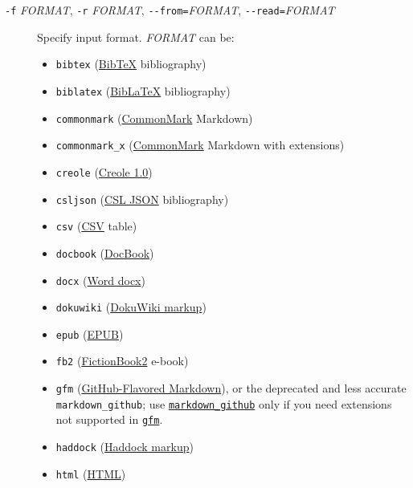 \documentclass[]{article}
\providecommand{\tightlist}{%
  \setlength{\itemsep}{0pt}\setlength{\parskip}{0pt}}
\begin{document}
\begin{description}
\item[\texttt{-f} \emph{FORMAT}, \texttt{-r} \emph{FORMAT},
\texttt{-\/-from=}\emph{FORMAT}, \texttt{-\/-read=}\emph{FORMAT}]
Specify input format. \emph{FORMAT} can be:

\hypertarget{input-formats}{}
\begin{itemize}
\tightlist
\item
  \texttt{bibtex} (\href{https://ctan.org/pkg/bibtex}{BibTeX}
  bibliography)
\item
  \texttt{biblatex} (\href{https://ctan.org/pkg/biblatex}{BibLaTeX}
  bibliography)
\item
  \texttt{commonmark} (\href{https://commonmark.org}{CommonMark}
  Markdown)
\item
  \texttt{commonmark\_x} (\href{https://commonmark.org}{CommonMark}
  Markdown with extensions)
\item
  \texttt{creole}
  (\href{http://www.wikicreole.org/wiki/Creole1.0}{Creole 1.0})
\item
  \texttt{csljson}
  (\href{https://citeproc-js.readthedocs.io/en/latest/csl-json/markup.html}{CSL
  JSON} bibliography)
\item
  \texttt{csv} (\href{https://tools.ietf.org/html/rfc4180}{CSV} table)
\item
  \texttt{docbook} (\href{https://docbook.org}{DocBook})
\item
  \texttt{docx}
  (\href{https://en.wikipedia.org/wiki/Office_Open_XML}{Word docx})
\item
  \texttt{dokuwiki} (\href{https://www.dokuwiki.org/dokuwiki}{DokuWiki
  markup})
\item
  \texttt{epub} (\href{http://idpf.org/epub}{EPUB})
\item
  \texttt{fb2}
  (\href{http://www.fictionbook.org/index.php/Eng:XML_Schema_Fictionbook_2.1}{FictionBook2}
  e-book)
\item
  \texttt{gfm}
  (\href{https://help.github.com/articles/github-flavored-markdown/}{GitHub-Flavored
  Markdown}), or the deprecated and less accurate
  \texttt{markdown\_github}; use
  \protect\hyperlink{markdown-variants}{\texttt{markdown\_github}} only
  if you need extensions not supported in
  \protect\hyperlink{markdown-variants}{\texttt{gfm}}.
\item
  \texttt{haddock}
  (\href{https://www.haskell.org/haddock/doc/html/ch03s08.html}{Haddock
  markup})
\item
  \texttt{html} (\href{https://www.w3.org/html/}{HTML})

\end{itemize}
\end{description}
\end{document}
